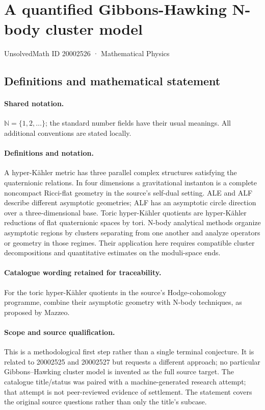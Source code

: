 \documentclass[11pt]{article}
\begin{document}
\setcounter{section}{20002525}
\section{A quantified Gibbons-Hawking N-body cluster model}\label{20002526}
{\small UnsolvedMath ID 20002526 · Mathematical Physics}
\subsection{Definitions and mathematical statement}

\paragraph{Shared notation.}$\mathbb N=\{1,2,\ldots\}$; the standard number fields have their usual meanings. All additional conventions are stated locally.


\paragraph{Definitions and notation.}A hyper-Kähler metric has three parallel complex structures satisfying the quaternionic relations. In four dimensions a gravitational instanton is a complete noncompact Ricci-flat geometry in the source’s self-dual setting. ALE and ALF describe different asymptotic geometries; ALF has an asymptotic circle direction over a three-dimensional base. Toric hyper-Kähler quotients are hyper-Kähler reductions of flat quaternionic spaces by tori. N-body analytical methods organize asymptotic regions by clusters separating from one another and analyze operators or geometry in those regimes. Their application here requires compatible cluster decompositions and quantitative estimates on the moduli-space ends.

\paragraph{Catalogue wording retained for traceability.}
For the toric hyper-Kähler quotients in the source’s Hodge-cohomology programme, combine their asymptotic geometry with N-body techniques, as proposed by Mazzeo.
\paragraph{Scope and source qualification.}This is a methodological first step rather than a single terminal conjecture. It is related to 20002525 and 20002527 but requests a different approach; no particular Gibbons–Hawking cluster model is invented as the full source target. The catalogue title/status was paired with a machine-generated research attempt; that attempt is not peer-reviewed evidence of settlement. The statement covers the original source questions rather than only the title’s subcase.
\end{document}
